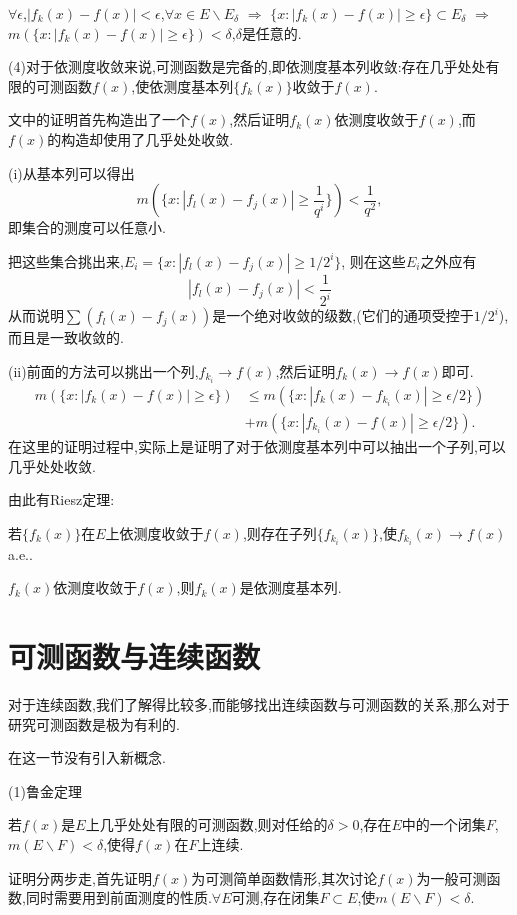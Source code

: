 \documentclass[12pt,a4paper,openany]{book}
\begin{document}
$\forall \epsilon$,$|f_k(x)-f(x)|<\epsilon$,$\forall x \in E \backslash E_{\delta}$ $\Rightarrow$ $\{x:|f_k(x)-f(x)|\ge\epsilon\} \subset E_{\delta}$ $\Rightarrow$ $m(\{x:|f_k(x)-f(x)|\ge\epsilon\}) < \delta$,$\delta$是任意的.

(4)对于依测度收敛来说,可测函数是完备的,即依测度基本列收敛:存在几乎处处有限的可测函数$f(x)$,使依测度基本列$\{f_k(x)\}$收敛于$f(x)$.

文中的证明首先构造出了一个$f(x)$,然后证明$f_k(x)$依测度收敛于$f(x)$,而$f(x)$的构造却使用了几乎处处收敛.

(i)从基本列可以得出
\[
m(\{x:|f_l(x) - f_j(x)| \ge \frac{1}{q^i}\}) < \frac{1}{q^2},
\]
即集合的测度可以任意小.

把这些集合挑出来,$E_i = \{x: |f_l(x) - f_j(x)| \ge 1/2^i\}$, 则在这些$E_i$之外应有
\[
|f_l(x) - f_j(x)| < \frac{1}{2^i}
\]
从而说明$\sum{(f_l(x) - f_j(x))}$是一个绝对收敛的级数,(它们的通项受控于$1/2^i$), 而且是一致收敛的.

(ii)前面的方法可以挑出一个列,$f_{k_i}\rightarrow f(x)$,然后证明$f_k(x)\rightarrow f(x)$即可.
\[
\begin{aligned}
m(\{x:|f_k(x) - f(x)| \ge \epsilon\}) &\le m(\{x:|f_k(x) - f_{k_i}(x)| \ge \epsilon/2\}) \\
&+m(\{x:|f_{k_i}(x) - f(x)| \ge \epsilon/2\}).
\end{aligned}
\]
在这里的证明过程中,实际上是证明了对于依测度基本列中可以抽出一个子列,可以几乎处处收敛.

由此有Riesz定理:

若$\{f_k(x)\}$在$E$上依测度收敛于$f(x)$,则存在子列$\{f_{k_i}(x)\}$,使$f_{k_i}(x)\rightarrow f(x)$ a.e..

$f_k(x)$依测度收敛于$f(x)$,则$f_k(x)$是依测度基本列.

\section{可测函数与连续函数}
对于连续函数,我们了解得比较多,而能够找出连续函数与可测函数的关系,那么对于研究可测函数是极为有利的.

在这一节没有引入新概念.

(1)鲁金定理

若$f(x)$是$E$上几乎处处有限的可测函数,则对任给的$\delta>0$,存在$E$中的一个闭集$F$,$m(E\backslash F)<\delta$,使得$f(x)$在$F$上连续.

证明分两步走,首先证明$f(x)$为可测简单函数情形,其次讨论$f(x)$为一般可测函数,同时需要用到前面测度的性质.$\forall E$可测,存在闭集$F \subset E$,使$m(E \backslash F)<\delta$.
\end{document}
